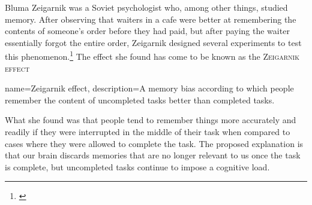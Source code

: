 Bluma Zeigarnik was a Soviet psychologist who, among other things, studied memory. After observing that waiters in a cafe were better at remembering the contents of someone's order before they had paid, but after paying the waiter essentially forgot the entire order, Zeigarnik designed several experiments to test this phenomenon.\footnote{\cite{zeigarnik1927}} The effect she found has come to be known as the \textsc{\Gls{Zeigarnik effect}}

{
name=Zeigarnik effect,
description={A memory bias according to which people remember the content of uncompleted tasks better than completed tasks.}
}

What she found was that people tend to remember things more accurately and readily if they were interrupted in the middle of their task when compared to cases where they were allowed to complete the task. The proposed explanation is that our brain discards memories that are no longer relevant to us once the task is complete, but uncompleted tasks continue to impose a cognitive load.